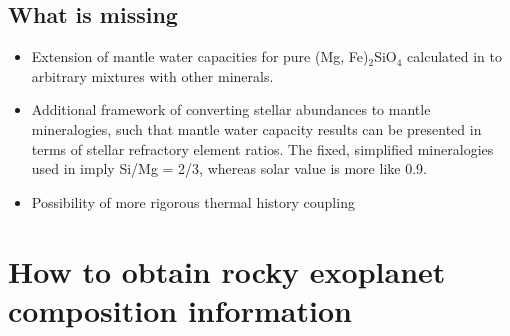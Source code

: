 \documentclass{article}
\begin{document}
\subsection{What is missing}

\begin{itemize}
\item Extension of mantle water capacities for pure (Mg, Fe)$_2$SiO$_4$ calculated in \citet{shahInternalWaterStorage2021} to arbitrary mixtures with other minerals. 
\item Additional framework of converting stellar abundances to mantle mineralogies, such that mantle water capacity results can be presented in terms of stellar refractory element ratios. The fixed, simplified mineralogies used in \citet{shahInternalWaterStorage2021} imply Si/Mg = 2/3, whereas solar value is more like 0.9.
\item Possibility of more rigorous thermal history coupling
\end{itemize}

\section{How to obtain rocky exoplanet composition information}
\end{document}
